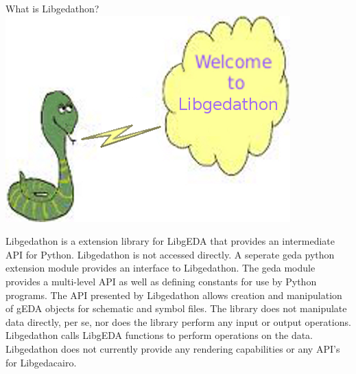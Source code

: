  What is Libgedathon?\includegraphics[scale=1]{./welcome_libgedathon.png} 

  Libgedathon is a extension library for LibgEDA that provides an intermediate API for Python. Libgedathon is not accessed directly. A seperate geda python extension module provides an interface to Libgedathon. The geda module provides a multi-level API as well as defining constants for use by Python programs. The API presented by Libgedathon allows creation and manipulation of gEDA objects for schematic and symbol files. The library does not manipulate data directly, per se, nor does the library perform any input or output operations. Libgedathon calls LibgEDA functions to perform operations on the data. Libgedathon does not currently provide any rendering capabilities or any API's for Libgedacairo. 
